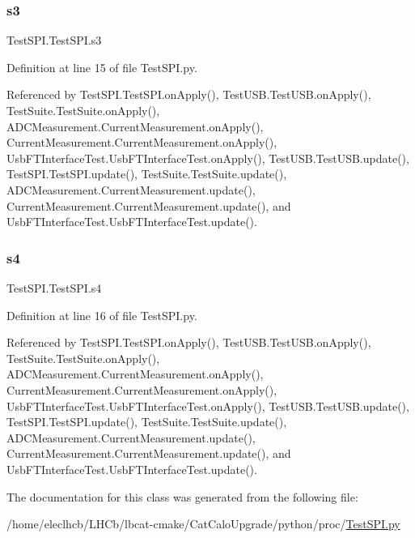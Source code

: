 \mbox{\label{classTestSPI_1_1TestSPI_aa4a1d8242e115a02b76a296993bf387e}} 
\subsubsection{\texorpdfstring{s3}{s3}}
{\footnotesize\ttfamily Test\+S\+P\+I.\+Test\+S\+P\+I.\+s3}



Definition at line 15 of file Test\+S\+P\+I.\+py.



Referenced by Test\+S\+P\+I.\+Test\+S\+P\+I.\+on\+Apply(), Test\+U\+S\+B.\+Test\+U\+S\+B.\+on\+Apply(), Test\+Suite.\+Test\+Suite.\+on\+Apply(), A\+D\+C\+Measurement.\+Current\+Measurement.\+on\+Apply(), Current\+Measurement.\+Current\+Measurement.\+on\+Apply(), Usb\+F\+T\+Interface\+Test.\+Usb\+F\+T\+Interface\+Test.\+on\+Apply(), Test\+U\+S\+B.\+Test\+U\+S\+B.\+update(), Test\+S\+P\+I.\+Test\+S\+P\+I.\+update(), Test\+Suite.\+Test\+Suite.\+update(), A\+D\+C\+Measurement.\+Current\+Measurement.\+update(), Current\+Measurement.\+Current\+Measurement.\+update(), and Usb\+F\+T\+Interface\+Test.\+Usb\+F\+T\+Interface\+Test.\+update().

\mbox{\label{classTestSPI_1_1TestSPI_a89c7f85cbef3c989e7a1f127988a403e}} 
\subsubsection{\texorpdfstring{s4}{s4}}
{\footnotesize\ttfamily Test\+S\+P\+I.\+Test\+S\+P\+I.\+s4}



Definition at line 16 of file Test\+S\+P\+I.\+py.



Referenced by Test\+S\+P\+I.\+Test\+S\+P\+I.\+on\+Apply(), Test\+U\+S\+B.\+Test\+U\+S\+B.\+on\+Apply(), Test\+Suite.\+Test\+Suite.\+on\+Apply(), A\+D\+C\+Measurement.\+Current\+Measurement.\+on\+Apply(), Current\+Measurement.\+Current\+Measurement.\+on\+Apply(), Usb\+F\+T\+Interface\+Test.\+Usb\+F\+T\+Interface\+Test.\+on\+Apply(), Test\+U\+S\+B.\+Test\+U\+S\+B.\+update(), Test\+S\+P\+I.\+Test\+S\+P\+I.\+update(), Test\+Suite.\+Test\+Suite.\+update(), A\+D\+C\+Measurement.\+Current\+Measurement.\+update(), Current\+Measurement.\+Current\+Measurement.\+update(), and Usb\+F\+T\+Interface\+Test.\+Usb\+F\+T\+Interface\+Test.\+update().



The documentation for this class was generated from the following file\+:\begin{DoxyCompactItemize}
\item 
/home/eleclhcb/\+L\+H\+Cb/lbcat-\/cmake/\+Cat\+Calo\+Upgrade/python/proc/\hyperlink{TestSPI_8py}{Test\+S\+P\+I.\+py}\end{DoxyCompactItemize}
